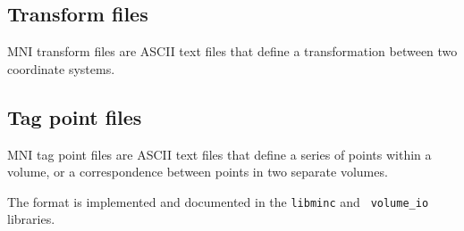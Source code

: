 \documentclass{article}
\begin{document}
\subsection{Transform files}

MNI transform files are ASCII text files that define a transformation
between two coordinate systems.

\subsection{Tag point files}

MNI tag point files are ASCII text files that define a series of points
within a volume, or a correspondence between points in two separate
volumes.

The format is implemented and documented in the {\tt libminc} and {\tt
 volume\_io} libraries.
\end{document}
